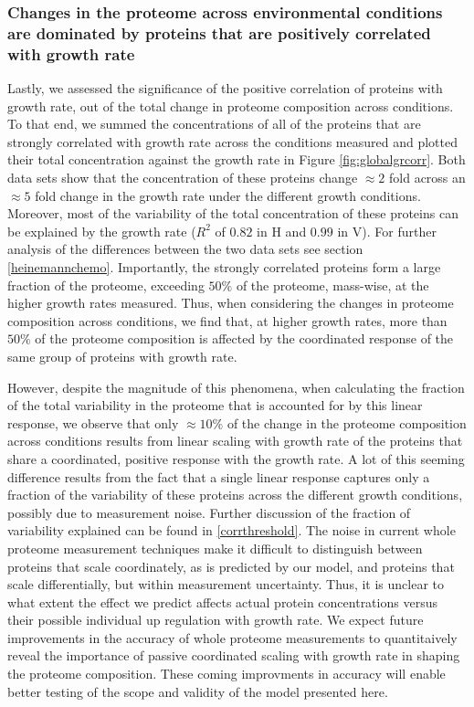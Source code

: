 \subsubsection{Changes in the proteome across environmental conditions are dominated by proteins that are positively correlated with growth rate}
Lastly, we assessed the significance of the positive correlation of proteins with growth rate, out of the total change in proteome composition across conditions.
To that end, we summed the concentrations of all of the proteins that are strongly correlated with growth rate across the conditions measured and plotted their total concentration against the growth rate in Figure \ref{fig:globalgrcorr}.
Both data sets show that the concentration of these proteins change $\approx 2$ fold across an $\approx 5$ fold change in the growth rate under the different growth conditions.
Moreover, most of the variability of the total concentration of these proteins can be explained by the growth rate ($R^2$ of $0.82$ in H and $0.99$ in V). 
For further analysis of the differences between the two data sets see section \ref{heinemannchemo}.
Importantly, the strongly correlated proteins form a large fraction of the proteome, exceeding $50\%$ of the proteome, mass-wise, at the higher growth rates measured.
Thus, when considering the changes in proteome composition across conditions, we find that, at higher growth rates, more than $50\%$ of the proteome composition is affected by the coordinated response of the same group of proteins with growth rate.

However, despite the magnitude of this phenomena, when calculating the fraction of the total variability in the proteome that is accounted for by this linear response, we observe that only $\approx 10\%$ of the change in the proteome composition across conditions results from linear scaling with growth rate of the proteins that share a coordinated, positive response with the growth rate.
A lot of this seeming difference results from the fact that a single linear response captures only a fraction of the variability of these proteins across the different growth conditions, possibly due to measurement noise.
Further discussion of the fraction of variability explained can be found in \ref{corrthreshold}.
The noise in current whole proteome measurement techniques make it difficult to distinguish between proteins that scale coordinately, as is predicted by our model, and proteins that scale differentially, but within measurement uncertainty.
Thus, it is unclear to what extent the effect we predict affects actual protein concentrations versus their possible individual up regulation with growth rate.
We expect future improvements in the accuracy of whole proteome measurements to quantitaively reveal the importance of passive coordinated scaling with growth rate in shaping the proteome composition. These coming improvments in accuracy will enable better testing of the scope and validity of the model presented here.